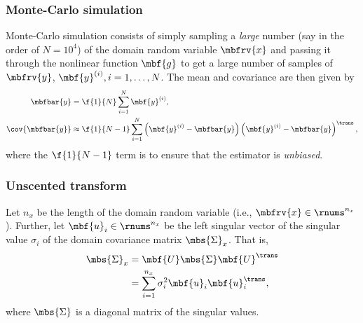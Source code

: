 \subsubsection{Monte-Carlo simulation}
Monte-Carlo simulation consists of simply sampling a \emph{large} number (say in the order of $N=10^{4}$) of the domain random variable $\mbfrv{x}$ and passing it through the nonlinear function $\mbf{g}$ to get a large number of samples of $\mbfrv{y}$, $\mbf{y}^{(i)}, i=1,\ldots,N$. The mean and covariance are then given by  
\begin{align}
    \mbfbar{y} &= \f{1}{N}\sum_{i=1}^{N}\mbf{y}^{(i)}, \\
    \cov{\mbfbar{y}} &\approx \f{1}{N-1}\sum_{i=1}^{N}\left( \mbf{y}^{(i)}-\mbfbar{y} \right)\left( \mbf{y}^{(i)}-\mbfbar{y} \right)^{\trans},
\end{align}
where the $\f{1}{N-1}$ term is to ensure that the estimator is \emph{unbiased}.

\subsubsection{Unscented transform}
Let $n_{x}$ be the length of the domain random variable (i.e., $\mbfrv{x}\in\rnums^{n_{x}}$). Further, let $\mbf{u}_{i}\in\rnums^{n_{x}}$ be the left singular vector of the singular value $\sigma_{i}$ of the domain covariance matrix $\mbs{\Sigma}_{x}$. That is, 
\begin{align}
    \mbs{\Sigma}_{x} &= \mbf{U}\mbs{\Sigma}\mbf{U}^{\trans}\\
    &= \sum_{i=1}^{n_{x}} \sigma_{i}^{2}\mbf{u}_{i}\mbf{u}_{i}^{\trans},
\end{align}
where $\mbs{\Sigma}$ is a diagonal matrix of the singular values.

